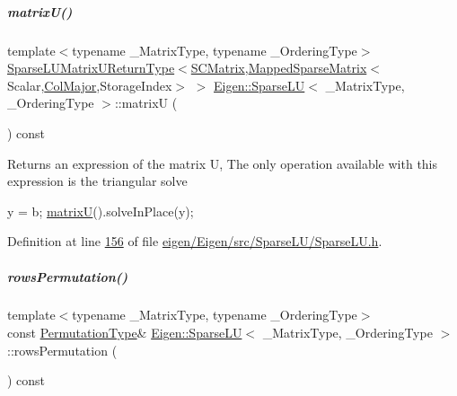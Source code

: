 \mbox{\label{group___sparse_l_u___module_aaf395a8fca527144215ff19cc7b8b637}} 
\subparagraph{\texorpdfstring{matrix\+U()}{matrixU()}\hspace{0.1cm}{\footnotesize\ttfamily [2/2]}}
{\footnotesize\ttfamily template$<$typename \+\_\+\+Matrix\+Type, typename \+\_\+\+Ordering\+Type$>$ \\
\hyperlink{struct_eigen_1_1_sparse_l_u_matrix_u_return_type}{Sparse\+L\+U\+Matrix\+U\+Return\+Type}$<$\hyperlink{group___sparse_l_u___module}{S\+C\+Matrix},\hyperlink{class_eigen_1_1_mapped_sparse_matrix}{Mapped\+Sparse\+Matrix}$<$Scalar,\hyperlink{group__enums_ggaacded1a18ae58b0f554751f6cdf9eb13a0cbd4bdd0abcfc0224c5fcb5e4f6669a}{Col\+Major},Storage\+Index$>$ $>$ \hyperlink{group___sparse_l_u___module_class_eigen_1_1_sparse_l_u}{Eigen\+::\+Sparse\+LU}$<$ \+\_\+\+Matrix\+Type, \+\_\+\+Ordering\+Type $>$\+::matrixU (\begin{DoxyParamCaption}{ }\end{DoxyParamCaption}) const\hspace{0.3cm}{\ttfamily [inline]}}

\begin{DoxyReturn}{Returns}
an expression of the matrix U, The only operation available with this expression is the triangular solve 
\begin{DoxyCode}
y = b; \hyperlink{group___sparse_l_u___module_aaf395a8fca527144215ff19cc7b8b637}{matrixU}().solveInPlace(y);
\end{DoxyCode}
 
\end{DoxyReturn}


Definition at line \hyperlink{eigen_2_eigen_2src_2_sparse_l_u_2_sparse_l_u_8h_source_l00156}{156} of file \hyperlink{eigen_2_eigen_2src_2_sparse_l_u_2_sparse_l_u_8h_source}{eigen/\+Eigen/src/\+Sparse\+L\+U/\+Sparse\+L\+U.\+h}.

\mbox{\label{group___sparse_l_u___module_a691295e65c06df599876d78ac2c7fada}} 
\subparagraph{\texorpdfstring{rows\+Permutation()}{rowsPermutation()}\hspace{0.1cm}{\footnotesize\ttfamily [1/2]}}
{\footnotesize\ttfamily template$<$typename \+\_\+\+Matrix\+Type, typename \+\_\+\+Ordering\+Type$>$ \\
const \hyperlink{group___core___module}{Permutation\+Type}\& \hyperlink{group___sparse_l_u___module_class_eigen_1_1_sparse_l_u}{Eigen\+::\+Sparse\+LU}$<$ \+\_\+\+Matrix\+Type, \+\_\+\+Ordering\+Type $>$\+::rows\+Permutation (\begin{DoxyParamCaption}{ }\end{DoxyParamCaption}) const\hspace{0.3cm}{\ttfamily [inline]}}

